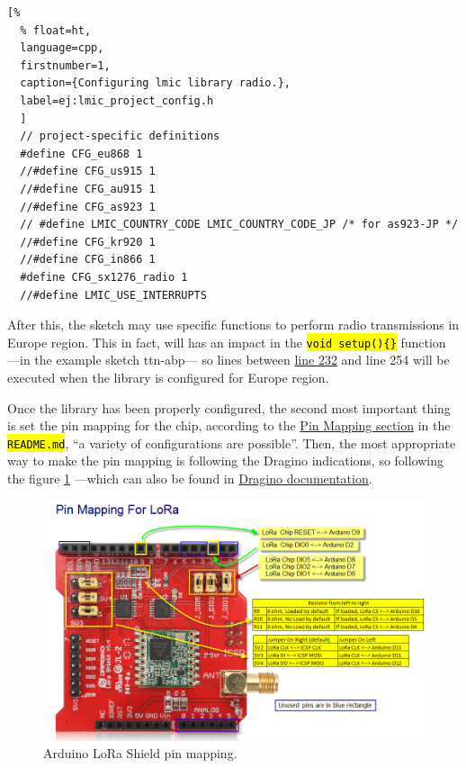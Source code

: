 \documentclass[11pt,a4paper,dvipsnames,twoside]{article}
\newcommand{\cmd}[1] {\hl{\texttt{#1}}}
\begin{document}
\begin{lstlisting}[%
  % float=ht,
  language=cpp,
  firstnumber=1,
  caption={Configuring lmic library radio.},
  label=ej:lmic_project_config.h
  ]
  // project-specific definitions
  #define CFG_eu868 1
  //#define CFG_us915 1
  //#define CFG_au915 1
  //#define CFG_as923 1
  // #define LMIC_COUNTRY_CODE LMIC_COUNTRY_CODE_JP	/* for as923-JP */
  //#define CFG_kr920 1
  //#define CFG_in866 1
  #define CFG_sx1276_radio 1
  //#define LMIC_USE_INTERRUPTS
\end{lstlisting}

After this, the sketch may use specific functions to perform radio transmissions in Europe region. This in fact, will has an impact in the \cmd{void setup()\{\}} function ---in the example sketch ttn-abp--- so lines between \href{https://github.com/mcci-catena/arduino-lmic/blob/master/examples/ttn-abp/ttn-abp.ino#L232}{line 232} and line 254 will be executed when the library is configured for Europe region.

Once the library has been properly configured, the second most important thing is set the pin mapping for the chip, according to the \href{https://github.com/mcci-catena/arduino-lmic#pin-mapping}{Pin Mapping section} in the \cmd{README.md}, \enquote{a variety of configurations are possible}. Then, the most appropriate way to make the pin mapping is following the Dragino indications, so following the figure \ref{fig:Ard_LoRa_Shield_pin_mapping} ---which can also be found in \href{http://wiki.dragino.com/index.php?title=Lora_Shield#Pin_Mapping_and_Unused_Pins}{Dragino documentation}.

\begin{figure}[ht]
  \centering
  \includegraphics[width=.9\textwidth]{../pictures/LoRa_Shield_Pin_Mapping.png}
  \caption{Arduino LoRa Shield pin mapping.}
  \label{fig:Ard_LoRa_Shield_pin_mapping}
\end{figure}
\end{document}
